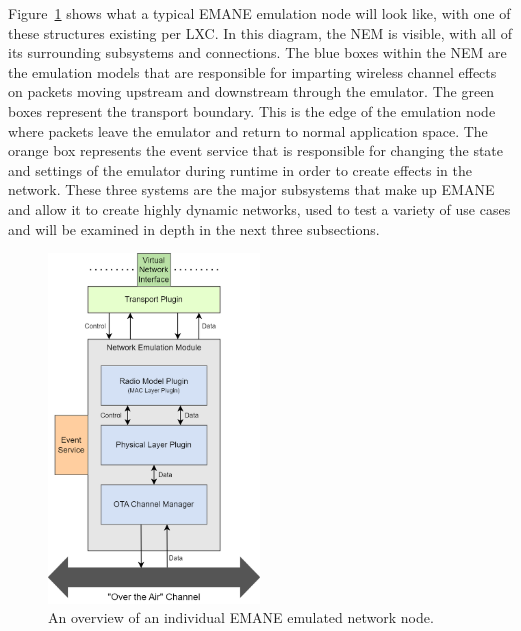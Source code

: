 Figure~\ref{emane_diagram} shows what a typical EMANE emulation node will look like, with one of these structures existing per LXC.
In this diagram, the NEM is visible, with all of its surrounding subsystems and connections.
The blue boxes within the NEM are the emulation models that are responsible for imparting wireless channel effects on packets moving upstream and downstream through the emulator.
The green boxes represent the transport boundary. This is the edge of the emulation node where packets leave the emulator and return to normal application space.
The orange box represents the event service that is responsible for changing the state and settings of the emulator during runtime in order to create effects in the network.
These three systems are the major subsystems that make up EMANE and allow it to create highly dynamic networks, used to test a variety of use cases and will be examined in depth in the next three subsections.

\begin{figure}[!ht]
    \centering
    \includegraphics[width=0.5\textwidth,keepaspectratio]{Images/Chpt2/emane_diagram.png}
    \caption{An overview of an individual EMANE emulated network node.}
    \label{emane_diagram}
\end{figure}

